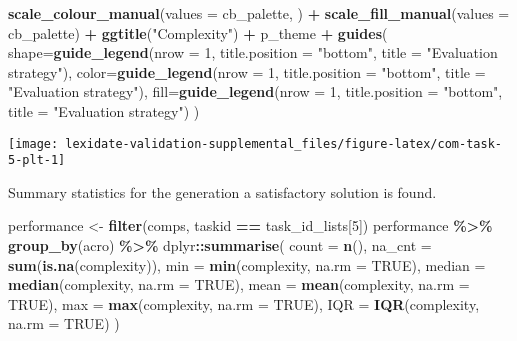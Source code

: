 \documentclass[
]{book}
\newenvironment{Shaded}{\begin{snugshade}}{\end{snugshade}}
\newcommand{\AttributeTok}[1]{\textcolor[rgb]{0.13,0.29,0.53}{#1}}
\newcommand{\ConstantTok}[1]{\textcolor[rgb]{0.56,0.35,0.01}{#1}}
\newcommand{\DecValTok}[1]{\textcolor[rgb]{0.00,0.00,0.81}{#1}}
\newcommand{\FunctionTok}[1]{\textcolor[rgb]{0.13,0.29,0.53}{\textbf{#1}}}
\newcommand{\NormalTok}[1]{#1}
\newcommand{\OtherTok}[1]{\textcolor[rgb]{0.56,0.35,0.01}{#1}}
\newcommand{\SpecialCharTok}[1]{\textcolor[rgb]{0.81,0.36,0.00}{\textbf{#1}}}
\newcommand{\StringTok}[1]{\textcolor[rgb]{0.31,0.60,0.02}{#1}}
\begin{document}
\begin{Shaded}
\begin{Highlighting}[]
  \FunctionTok{scale\_colour\_manual}\NormalTok{(}\AttributeTok{values =}\NormalTok{ cb\_palette, ) }\SpecialCharTok{+}
  \FunctionTok{scale\_fill\_manual}\NormalTok{(}\AttributeTok{values =}\NormalTok{ cb\_palette) }\SpecialCharTok{+}
  \FunctionTok{ggtitle}\NormalTok{(}\StringTok{"Complexity"}\NormalTok{) }\SpecialCharTok{+}
\NormalTok{  p\_theme }\SpecialCharTok{+}
  \FunctionTok{guides}\NormalTok{(}
    \AttributeTok{shape=}\FunctionTok{guide\_legend}\NormalTok{(}\AttributeTok{nrow =} \DecValTok{1}\NormalTok{, }\AttributeTok{title.position =} \StringTok{"bottom"}\NormalTok{,}
                       \AttributeTok{title =} \StringTok{"Evaluation strategy"}\NormalTok{),}
    \AttributeTok{color=}\FunctionTok{guide\_legend}\NormalTok{(}\AttributeTok{nrow =} \DecValTok{1}\NormalTok{, }\AttributeTok{title.position =} \StringTok{"bottom"}\NormalTok{,}
                       \AttributeTok{title =} \StringTok{"Evaluation strategy"}\NormalTok{),}
    \AttributeTok{fill=}\FunctionTok{guide\_legend}\NormalTok{(}\AttributeTok{nrow =} \DecValTok{1}\NormalTok{, }\AttributeTok{title.position =} \StringTok{"bottom"}\NormalTok{,}
                      \AttributeTok{title =} \StringTok{"Evaluation strategy"}\NormalTok{)}
\NormalTok{  )}
\end{Highlighting}
\end{Shaded}

\texttt{[image: lexidate-validation-supplemental\_files/figure-latex/com-task-5-plt-1]}

Summary statistics for the generation a satisfactory solution is found.

\begin{Shaded}
\begin{Highlighting}[]
\NormalTok{performance }\OtherTok{\textless{}{-}} \FunctionTok{filter}\NormalTok{(comps, taskid }\SpecialCharTok{==}\NormalTok{ task\_id\_lists[}\DecValTok{5}\NormalTok{])}
\NormalTok{performance }\SpecialCharTok{\%\textgreater{}\%}
  \FunctionTok{group\_by}\NormalTok{(acro) }\SpecialCharTok{\%\textgreater{}\%}
\NormalTok{  dplyr}\SpecialCharTok{::}\FunctionTok{summarise}\NormalTok{(}
    \AttributeTok{count =} \FunctionTok{n}\NormalTok{(),}
    \AttributeTok{na\_cnt =} \FunctionTok{sum}\NormalTok{(}\FunctionTok{is.na}\NormalTok{(complexity)),}
    \AttributeTok{min =} \FunctionTok{min}\NormalTok{(complexity, }\AttributeTok{na.rm =} \ConstantTok{TRUE}\NormalTok{),}
    \AttributeTok{median =} \FunctionTok{median}\NormalTok{(complexity, }\AttributeTok{na.rm =} \ConstantTok{TRUE}\NormalTok{),}
    \AttributeTok{mean =} \FunctionTok{mean}\NormalTok{(complexity, }\AttributeTok{na.rm =} \ConstantTok{TRUE}\NormalTok{),}
    \AttributeTok{max =} \FunctionTok{max}\NormalTok{(complexity, }\AttributeTok{na.rm =} \ConstantTok{TRUE}\NormalTok{),}
    \AttributeTok{IQR =} \FunctionTok{IQR}\NormalTok{(complexity, }\AttributeTok{na.rm =} \ConstantTok{TRUE}\NormalTok{)}
\NormalTok{  )}
\end{Highlighting}
\end{Shaded}
\end{document}
